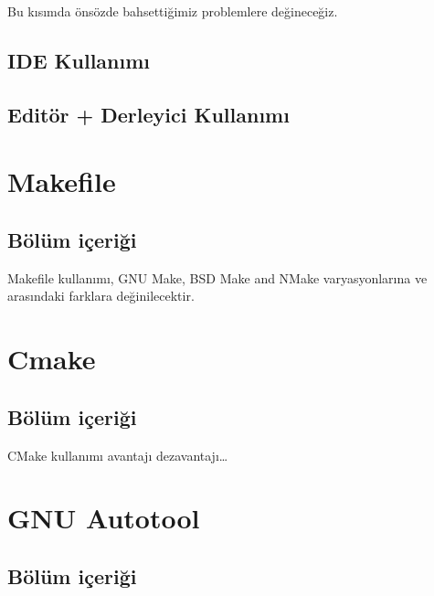 \documentclass[
]{book}
\begin{document}
Bu kısımda önsözde bahsettiğimiz problemlere değineceğiz.

\hypertarget{ide-kullanux131mux131}{%
\section{IDE Kullanımı}\label{ide-kullanux131mux131}}

\hypertarget{edituxf6r-derleyici-kullanux131mux131}{%
\section{Editör + Derleyici Kullanımı}\label{edituxf6r-derleyici-kullanux131mux131}}

\hypertarget{makefile}{%
\chapter{Makefile}\label{makefile}}

\hypertarget{buxf6luxfcm-iuxe7eriux11fi-1}{%
\section{Bölüm içeriği}\label{buxf6luxfcm-iuxe7eriux11fi-1}}

Makefile kullanımı, GNU Make, BSD Make and NMake varyasyonlarına ve arasındaki farklara değinilecektir.

\hypertarget{cmake}{%
\chapter{Cmake}\label{cmake}}

\hypertarget{buxf6luxfcm-iuxe7eriux11fi-2}{%
\section{Bölüm içeriği}\label{buxf6luxfcm-iuxe7eriux11fi-2}}

CMake kullanımı avantajı dezavantajı\ldots{}

\hypertarget{gnu-autotool}{%
\chapter{GNU Autotool}\label{gnu-autotool}}

\hypertarget{buxf6luxfcm-iuxe7eriux11fi-3}{%
\section{Bölüm içeriği}\label{buxf6luxfcm-iuxe7eriux11fi-3}}
\end{document}
